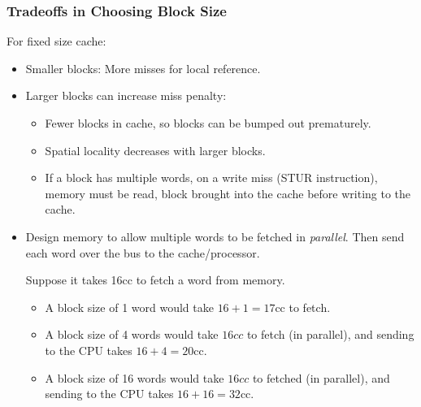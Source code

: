 \begin{frame}\frametitle{Tradeoffs in Choosing Block Size}
For fixed size cache:
\begin{itemize}
    \item Smaller blocks: More misses for local reference.
\item Larger blocks can increase miss penalty:
\begin{itemize}
\item Fewer blocks in cache, so blocks can be bumped out prematurely.
\item Spatial locality decreases with larger blocks.
\item  If a block has multiple words, on a write miss (STUR instruction), memory must be read, block brought into the cache before writing to the cache. 
\end{itemize}
\item Design memory to allow multiple words to be fetched in \emph{parallel}. Then send each word over the bus to the cache/processor.

{\footnotesize
Suppose it takes 16cc to fetch a word from memory.
\begin{itemize}
\item A block size of 1 word would take $16 + 1 = 17$cc to fetch.
\item A block size of 4 words would take $16cc$ to fetch (in parallel), and sending to the CPU takes $16 + 4 = 20$cc.
\item A block size of 16 words would take $16cc$ to fetched (in parallel), and sending to the CPU takes $16 + 16 = 32$cc.
\end{itemize}
}

\end{itemize}

\end{frame}



